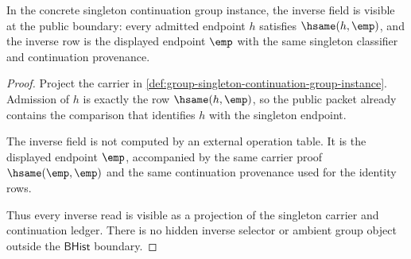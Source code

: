 \begin{theorem}
\label{thm:group-singleton-inverse-boundary}
In the concrete singleton continuation group instance, the inverse field is visible at the public boundary: every admitted endpoint $h$ satisfies $\hsame(h,\emp)$, and the inverse row is the displayed endpoint $\emp$ with the same singleton classifier and continuation provenance.
\end{theorem}
\begin{proof}
Project the carrier in \autoref{def:group-singleton-continuation-group-instance}. Admission of $h$ is exactly the row $\hsame(h,\emp)$, so the public packet already contains the comparison that identifies $h$ with the singleton endpoint.

The inverse field is not computed by an external operation table. It is the displayed endpoint $\emp$, accompanied by the same carrier proof $\hsame(\emp,\emp)$ and the same continuation provenance used for the identity rows.

Thus every inverse read is visible as a projection of the singleton carrier and continuation ledger. There is no hidden inverse selector or ambient group object outside the $\mathsf{BHist}$ boundary.
\end{proof}
